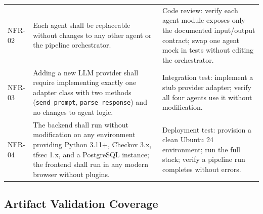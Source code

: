 \begin{longtable}{@{}p{}p{}p{}@{}}
NFR-02 & Each agent shall be replaceable without changes to any other agent
  or the pipeline orchestrator. &
  Code review: verify each agent module exposes only the documented
  input/output contract; swap one agent mock in tests without editing
  the orchestrator. \\

NFR-03 & Adding a new LLM provider shall require implementing exactly one
  adapter class with two methods (\texttt{send\_prompt},
  \texttt{parse\_response}) and no changes to agent logic. &
  Integration test: implement a stub provider adapter; verify all four
  agents use it without modification. \\

NFR-04 & The backend shall run without modification on any environment
  providing Python 3.11+, Checkov 3.x, tfsec 1.x, and a PostgreSQL
  instance; the frontend shall run in any modern browser without plugins. &
  Deployment test: provision a clean Ubuntu 24 environment; run the
  full stack; verify a pipeline run completes without errors. \\

\bottomrule
\end{longtable}

\subsection*{Artifact Validation Coverage}

